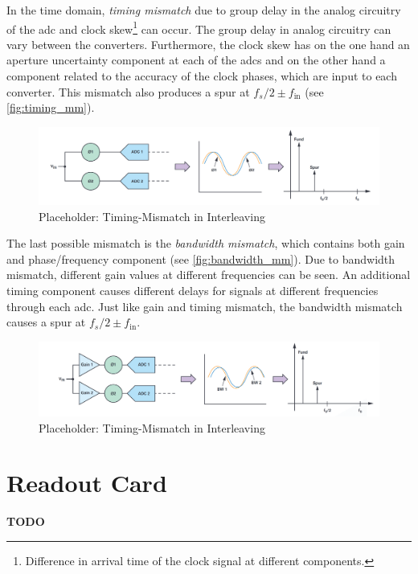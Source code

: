 In the time domain, \textit{timing mismatch} due to group delay in the analog circuitry of the \gls{adc} and clock skew\footnote{Difference in arrival time of the clock signal at different components.} can occur. The group delay in analog circuitry can vary between the converters. Furthermore, the clock skew has on the one hand an aperture uncertainty component at each of the \glspl{adc} and on the other hand a component related to the accuracy of the clock phases, which are input to each converter. \cite{Harris2019} This mismatch also produces a spur at $f_s/2 \pm f_{\text{in}}$ (see \autoref{fig:timing_mm}).

\begin{figure}[tbh]
	\centering
	\includegraphics[width = \textwidth]{chap/02-theory/img/timing_mm}
	\caption{Placeholder: Timing-Mismatch in Interleaving \cite{Harris2019}}
	\label{fig:timing_mm}
\end{figure}

The last possible mismatch is the \textit{bandwidth mismatch}, which contains both gain and phase/frequency component (see \autoref{fig:bandwidth_mm}). Due to bandwidth mismatch, different gain values at different frequencies can be seen. An additional timing component causes different delays for signals at different frequencies through each \gls{adc}. Just like gain and timing mismatch, the bandwidth mismatch causes a spur at $f_s/2 \pm f_{\text{in}}$.
\begin{figure}[tbh]
	\centering
	\includegraphics[width = \textwidth]{chap/02-theory/img/bandwidth_mm}
	\caption{Placeholder: Timing-Mismatch in Interleaving \cite{Harris2019}}
	\label{fig:bandwidth_mm}
\end{figure}


\section{Readout Card}
\textbf{TODO}
